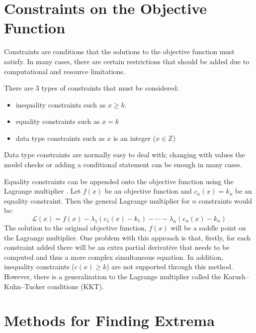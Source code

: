 \documentclass[10pt,a4paper]{report}
\begin{document}
		\section{Constraints on the Objective Function}
			Constraints are conditions that the solutions to the objective function must satisfy. In many cases, there are
			certain restrictions that should be added due to computational and resource limitations. \par
			There are 3 types of constraints that must be considered:
			\begin{itemize}
				\item inequality constraints such as $x \geq k$.
				\item equality constraints such as $x = k$
				\item data type constraints such as $x$ is an integer ($x \in \mathbb{Z}$)
			\end{itemize}
			Data type constraints are normally easy to deal with; changing with values the model checks or adding a conditional statement
			can be enough in many cases. \par
			Equality constraints can be appended onto the objective function using the Lagrange multiplier \autocite{LagrangeMultiplier}. Let
			$f(x)$ be an objective function and $c_{n}(x) = k_n$ be an equality constraint. Then the general Lagrange multiplier for $n$ constraints would be:
			\begin{equation}
				\mathcal{L} (x) = f(x) - \lambda_1(c_{1}(x) - k_1) - \cdots - \lambda_n(c_{n}(x) - k_n)
			\end{equation}
			The solution to the original objective function, $f(x)$ will be a saddle point on the Lagrange multiplier. One problem with this
			approach is that, firstly, for each constraint added there will be an extra partial derivative that needs to be computed and thus a more
			complex simultaneous equation. In addition, inequality constraints ($c(x) \geq k$) are not supported through this method. However, there
			is a generalization to the Lagrange multiplier called the Karush–Kuhn–Tucker conditions (KKT).

		\section{Methods for Finding Extrema}
\end{document}
